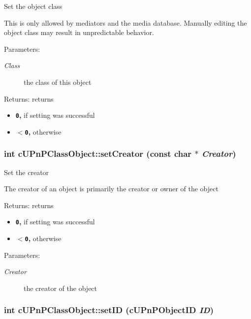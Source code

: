 Set the object class

This is only allowed by mediators and the media database. Manually editing the object class may result in unpredictable behavior.

\begin{Desc}
\item[Parameters:]
\begin{description}
\item[{\em Class}]the class of this object \end{description}
\end{Desc}
\begin{Desc}
\item[Returns:]returns\begin{itemize}
\item {\bf {\tt 0},} if setting was successful\item {\bf {\tt $<$0},} otherwise \end{itemize}
\end{Desc}
\hypertarget{classcUPnPClassObject_b59e3528eda8c223f5336bd8a7d47527}{
\subsubsection[{setCreator}]{\setlength{\rightskip}{0pt plus 5cm}int cUPnPClassObject::setCreator (const char $\ast$ {\em Creator})}}
\label{classcUPnPClassObject_b59e3528eda8c223f5336bd8a7d47527}


Set the creator

The creator of an object is primarily the creator or owner of the object

\begin{Desc}
\item[Returns:]returns\begin{itemize}
\item {\bf {\tt 0},} if setting was successful\item {\bf {\tt $<$0},} otherwise \end{itemize}
\end{Desc}
\begin{Desc}
\item[Parameters:]
\begin{description}
\item[{\em Creator}]the creator of the object \end{description}
\end{Desc}
\hypertarget{classcUPnPClassObject_1e00f20de14c17cfebd4f6670d5e548d}{
\subsubsection[{setID}]{\setlength{\rightskip}{0pt plus 5cm}int cUPnPClassObject::setID ({\bf cUPnPObjectID} {\em ID})}}
\label{classcUPnPClassObject_1e00f20de14c17cfebd4f6670d5e548d}


